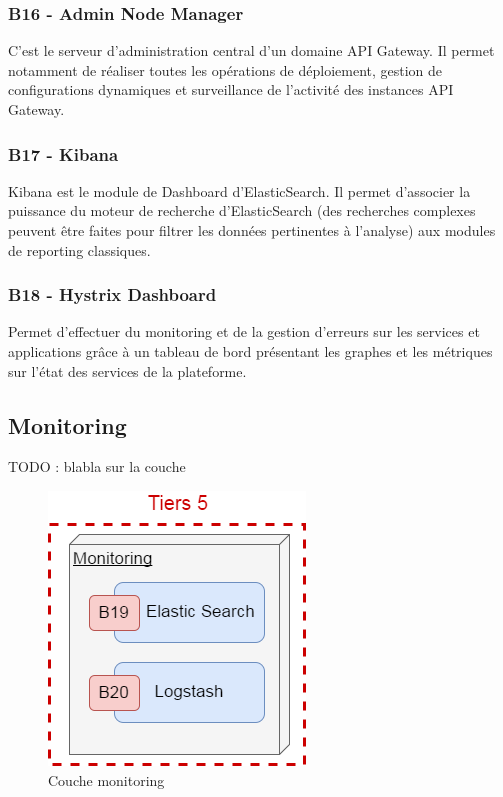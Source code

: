 	\subsubsection{B16 - Admin Node Manager}
	C’est le serveur d’administration central d’un domaine API Gateway. Il permet notamment de réaliser toutes les opérations de déploiement, gestion de configurations dynamiques et surveillance de l’activité des instances API Gateway.
	
	\subsubsection{B17 - Kibana}
	Kibana est le module de Dashboard d'ElasticSearch. Il permet d'associer la puissance du moteur de recherche d'ElasticSearch (des recherches complexes peuvent être faites pour filtrer les données pertinentes à l'analyse) aux modules de reporting classiques.
	
	\subsubsection{B18 - Hystrix Dashboard}
	Permet d’effectuer du monitoring et de la gestion d’erreurs sur les services et applications grâce à un tableau de bord présentant les graphes et les métriques sur l’état des services de la plateforme.

\subsection{Monitoring}

	TODO : blabla sur la couche
	
\begin{figure}[H]
	\includegraphics[scale=0.5]{images/travailNeuflizeOBC/architecture/coucheMonitoring.png}
	\centering
	\caption{Couche monitoring}
	\label{coucheMonitoring}
\end{figure}

